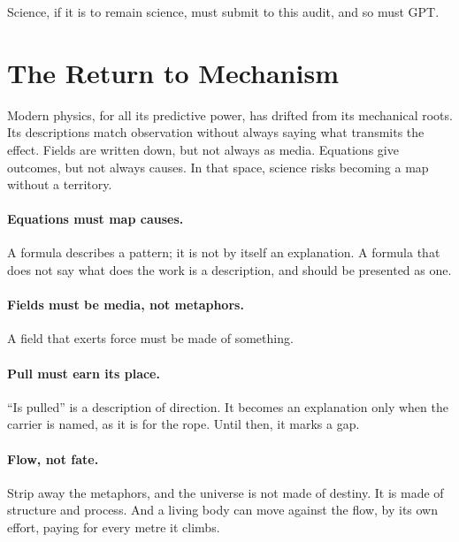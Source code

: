 \documentclass[11pt,a4paper]{article}
\begin{document}
Science, if it is to remain science, must submit to this audit, and so must GPT.

\section{The Return to Mechanism}

Modern physics, for all its predictive power, has drifted from its mechanical roots. Its descriptions match observation without always saying what transmits the effect. Fields are written down, but not always as media. Equations give outcomes, but not always causes. In that space, science risks becoming a map without a territory.

\paragraph{Equations must map causes.} A formula describes a pattern; it is not by itself an explanation.  A formula that does not say what does the work is a description, and should be presented as one.

\paragraph{Fields must be media, not metaphors.} A field that exerts force must be made of something. 

\paragraph{Pull must earn its place.} ``Is pulled'' is a description of direction. It becomes an explanation only when the carrier is named, as it is for the rope. Until then, it marks a gap.

\paragraph{Flow, not fate.} Strip away the metaphors, and the universe is not made of destiny. It is made of structure and process.  And a living body can move against the flow, by its own effort, paying for every metre it climbs.
\end{document}

